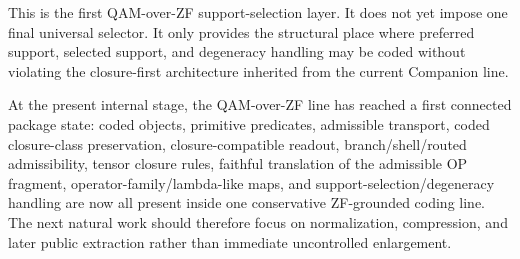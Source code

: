 \begin{remark}
This is the first QAM-over-ZF support-selection layer. It does not yet impose one final universal selector. It only provides the structural place where preferred support, selected support, and degeneracy handling may be coded without violating the closure-first architecture inherited from the current Companion line.
\end{remark}


\begin{remark}
At the present internal stage, the QAM-over-ZF line has reached a first connected package state: coded objects, primitive predicates, admissible transport, coded closure-class preservation, closure-compatible readout, branch/shell/routed admissibility, tensor closure rules, faithful translation of the admissible OP fragment, operator-family/lambda-like maps, and support-selection/degeneracy handling are now all present inside one conservative ZF-grounded coding line. The next natural work should therefore focus on normalization, compression, and later public extraction rather than immediate uncontrolled enlargement.
\end{remark}


\clearpage

